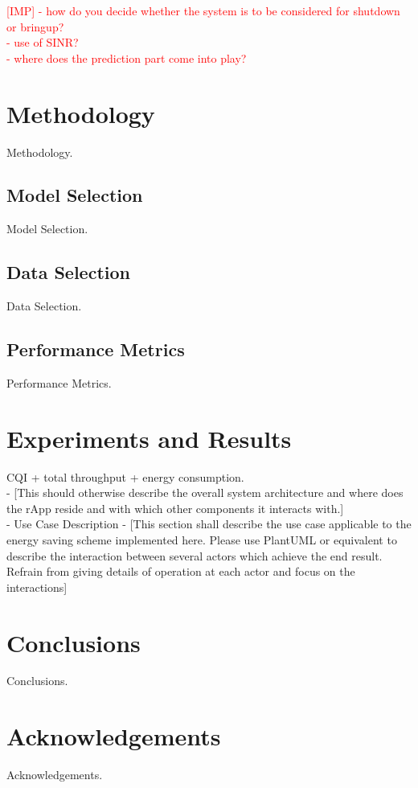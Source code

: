 \documentclass[conference]{IEEEtran}
\begin{document}
\textcolor{red}{
[IMP] 
- how do you decide whether the system is to be considered for shutdown or bringup? \\
- use of SINR? \\
- where does the prediction part come into play? \\
}

\section{Methodology}
Methodology.

\subsection{Model Selection}
Model Selection.

\subsection{Data Selection}
Data Selection.

\subsection{Performance Metrics}
Performance Metrics.

\section{Experiments and Results}
CQI + total throughput + energy consumption. \\

- [This should otherwise describe the overall system architecture and where does the rApp reside and
with which other components it interacts with.] \\
- Use Case Description - [This section shall describe the use case applicable to the energy saving scheme implemented here. Please use PlantUML or equivalent to describe the interaction between several actors which achieve the end result. Refrain from giving details of operation at each actor and focus on the interactions]

\section{Conclusions}
Conclusions.

\section{Acknowledgements}
Acknowledgements.

\vspace{12pt}
\end{document}
